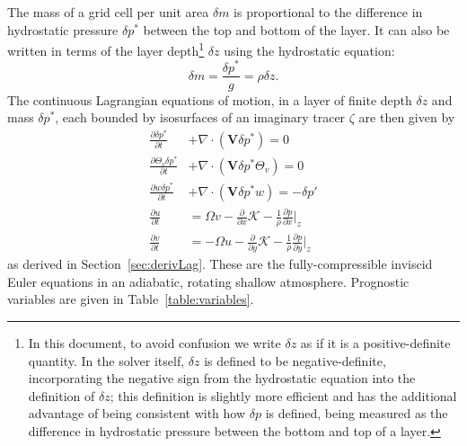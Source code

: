 \documentclass[10pt,letterpaper,margin=1in]{memoir}
\begin{document}
The mass of a grid cell per unit area $\delta m$ is proportional to the difference in hydrostatic pressure $\delta p^*$ between the top and bottom of the layer. It can also be written in terms of the layer depth\footnote{In this document, to avoid confusion we write $\delta z$ as if it is a positive-definite quantity. In the solver itself, $\delta z$ is defined to be negative-definite, incorporating the negative sign from the hydrostatic equation into the definition of $\delta z$; this definition is slightly more efficient and has the additional advantage of being consistent with how $\delta p$ is defined, being measured as the difference in hydrostatic pressure between the bottom and top of a layer.} $\delta z$ using the hydrostatic equation:
\begin{equation} \label{eqn:massdefn}
\delta m = \frac{\delta p^*}{g} = \rho \delta z.
\end{equation}
The continuous Lagrangian equations of motion, in a layer of finite depth $\delta z$ and mass $\delta p^*$, each bounded by isosurfaces of an imaginary tracer $\zeta$ are then given by
\begin{subequations} \label{eqn:contLag}
\begin{align} 
\frac{ \partial \delta p^*}{\partial t} & + \nabla \cdot \left (\mathbf{V} \delta p^* \right ) =  0 \label{eqn:contLagdelp} \\
\frac{ \partial \Theta_v \delta p^*}{\partial t}  & + \nabla \cdot \left (\mathbf{V} \delta p^* \Theta_v \right ) = 0 \\
\frac{ \partial w \delta p^*}{\partial t} & + \nabla \cdot \left (\mathbf{V}  \delta p^* w \right ) = -\delta p' \label{eqn:contLagw}   \\
\frac{ \partial u}{\partial t}  & = \Omega v - \frac{\partial}{\partial x} \mathcal{K} -  \frac{1}{\rho} \frac{\partial p}{\partial x}\Big |_z    \label{eqn:contLagu} \\ 
\frac{ \partial v}{\partial t} & = - \Omega u -\frac{\partial}{\partial y} \mathcal{K} -  \frac{1}{\rho} \frac{\partial p}{\partial y} \Big |_z  \label{eqn:contLagv} 
\end{align}
\end{subequations}
as derived in Section~\ref{sec:derivLag}. These are the fully-compressible inviscid Euler equations in an adiabatic, rotating shallow atmosphere. Prognostic variables are given in Table~\ref{table:variables}. 
\end{document}
